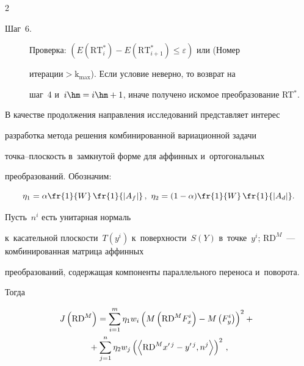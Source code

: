 \begin{multicols}{2}
\begin{description}
\item[Шаг~6.] Проверка: $({E}(\mathrm{RT}^*_i)-

{E}(\mathrm{RT}^*_{i+1})\leq \varepsilon)$ или (Номер  

ите\-ра\-ции\;$>$\;$\mathrm{k}_{\max}$). Если условие неверно, то возврат на 

шаг~4 и~$i \hm= i \hm+ 1$, иначе получено искомое преобразование RT$^*$.

\end{description}

  

  В качестве продолжения направления исследований представляет интерес 

разработка метода решения комбинированной вариационной задачи  

точ\-ка--плос\-кость в~замкнутой форме для аффинных и~ортогональных 

преобразований. Обозначим: 

  \begin{equation*}

  \eta_1=\alpha\fr{1}{{W}}\,\fr{1}{\vert 

{A}_{{f}}\vert}\,,\

  \eta_2=(1-\alpha) \fr{1}{{W}}\,\fr{1}{\vert 

{A}_{d}\vert}.

\end{equation*}

 Пусть~$n^i$ есть унитарная нормаль 

к~касательной плос\-кости~$T({y}^i)$ к~поверхности~$S(Y)$ в~точке~$y^i$; $\mathrm{RD}^M$~--- комбинированная матрица аффинных 

преобразований, содержащая компоненты параллельного переноса и~поворота. 

Тогда

  \begin{multline*}

  \hspace*{-2.90392pt}J\left( \mathrm{RD}^M\right) =\sum\limits^m_{i=1} \eta_1{w}_i \left( M\left( 

\mathrm{RD}^M F_x^i\right) -M\left( F_y^i\right)\right)^2+{}\\

  {}+\sum\limits_{j=1}^n \eta_2 {w}_j \left( \left\langle \mathrm{RD}^M 

x^{\prime\,j} -y^{\prime\,j}, n^j\right\rangle \right)^2\,,


  \end{multline*}


\end{multicols}
